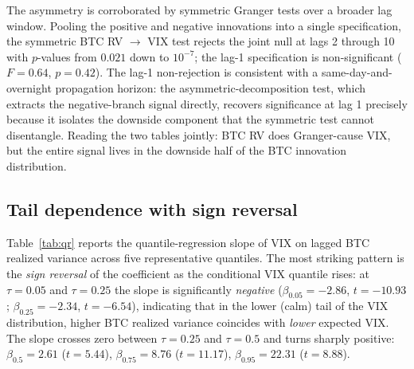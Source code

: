 \documentclass[11pt,a4paper]{article}
\begin{document}
The asymmetry is corroborated by symmetric Granger tests over a broader lag window. Pooling the positive and negative innovations into a single specification, the symmetric BTC RV $\to$ VIX test rejects the joint null at lags 2 through 10 with $p$-values from $0.021$ down to $10^{-7}$; the lag-1 specification is non-significant ($F = 0.64$, $p = 0.42$).%
 The lag-1 non-rejection is consistent with a same-day-and-overnight propagation horizon: the asymmetric-decomposition test, which extracts the negative-branch signal directly, recovers significance at lag 1 precisely because it isolates the downside component that the symmetric test cannot disentangle. Reading the two tables jointly: BTC RV does Granger-cause VIX, but the entire signal lives in the downside half of the BTC innovation distribution.

\subsection{Tail dependence with sign reversal}
\label{subsec:r_qr}

Table~\ref{tab:qr} reports the quantile-regression slope of VIX on lagged BTC realized variance across five representative quantiles. The most striking pattern is the \emph{sign reversal} of the coefficient as the conditional VIX quantile rises: at $\tau = 0.05$ and $\tau = 0.25$ the slope is significantly \emph{negative} ($\beta_{0.05} = -2.86$, $t = -10.93$; $\beta_{0.25} = -2.34$, $t = -6.54$), indicating that in the lower (calm) tail of the VIX distribution, higher BTC realized variance coincides with \emph{lower} expected VIX. The slope crosses zero between $\tau = 0.25$ and $\tau = 0.5$ and turns sharply positive: $\beta_{0.5} = 2.61$ ($t = 5.44$), $\beta_{0.75} = 8.76$ ($t = 11.17$), $\beta_{0.95} = 22.31$ ($t = 8.88$).%
\end{document}
